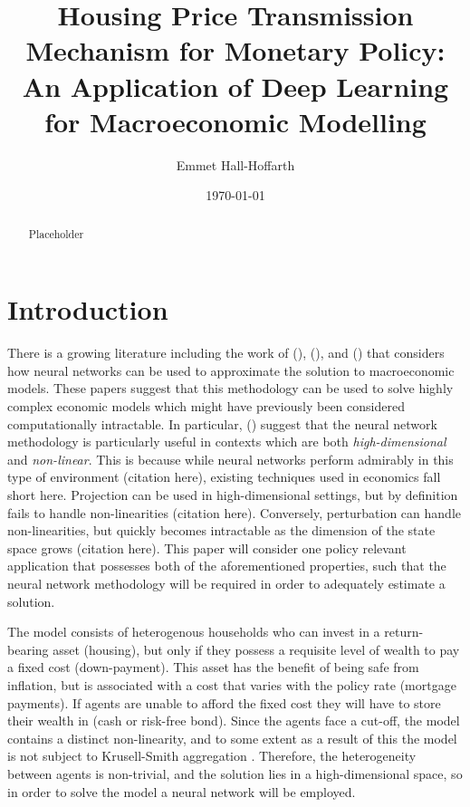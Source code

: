 \documentclass{article}
\title{Housing Price Transmission Mechanism for Monetary Policy: An Application of Deep Learning for Macroeconomic Modelling}
\author{Emmet Hall-Hoffarth}
\date{\today}
\begin{document}
\maketitle
    
\begin{abstract}

Placeholder

\end{abstract}


\section{Introduction}

There is a growing literature including the work of \citeauthor{duarte2018machine} (\citeyear{duarte2018machine}), \citeauthor{azinovic2019deep} (\citeyear{azinovic2019deep}), and \citeauthor{maliar2021deep} (\citeyear{maliar2021deep}) that considers how neural networks can be used to approximate the solution to macroeconomic models. These papers suggest that this methodology can be used to solve highly complex economic models which might have previously been considered computationally intractable. In particular, \citeauthor{han2021deepham} (\citeyear{han2021deepham}) suggest that the neural network methodology is particularly useful in contexts which are both \textit{high-dimensional} and \textit{non-linear}. This is because while neural networks perform admirably in this type of environment (citation here), existing techniques used in economics fall short here. Projection can be used in high-dimensional settings, but by definition fails to handle non-linearities (citation here). Conversely, perturbation can handle non-linearities, but quickly becomes intractable as the dimension of the state space grows (citation here). This paper will consider one policy relevant application that possesses both of the aforementioned properties, such that the neural network methodology will be required in order to adequately estimate a solution.

The model consists of heterogenous households who can invest in a return-bearing asset (housing), but only if they possess a requisite level of wealth to pay a fixed cost (down-payment). This asset has the benefit of being safe from inflation, but is associated with a cost that varies with the policy rate (mortgage payments). If agents are unable to afford the fixed cost they will have to store their wealth in (cash or risk-free bond). Since the agents face a cut-off, the model contains a distinct non-linearity, and to some extent as a result of this the model is not subject to Krusell-Smith aggregation \parencite{krusell1998income}. Therefore, the heterogeneity between agents is non-trivial, and the solution lies in a high-dimensional space, so in order to solve the model a neural network will be employed. 
\end{document}
